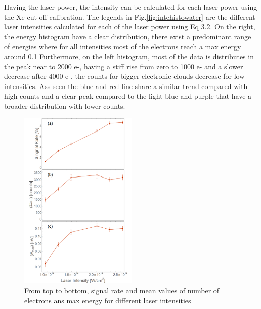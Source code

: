 Having the laser power, the intensity can be calculated for each laser power using the Xe cut off calibration. The legends in Fig.\ref{fig:intehistowater} are the different laser intensities calculated for each of the laser power using Eq 3.2. On the right, the energy histogram have a clear distribution, there exist a predominant range of energies where for all intensities most of the electrons reach a max energy around 0.1  Furthermore, on the left histogram, most of the data is distributes in the peak near to 2000 e-, having a stiff rise from zero to 1000 e- and a slower decrease after 4000 e-, the counts for bigger electronic clouds  decrease for low intensities. Ass seen the blue and red line share a similar trend compared with high counts and a clear peak compared to the light blue and purple that have a broader distribution with lower counts.

\begin{figure}[h!]
\centering
\includegraphics[width=0.5\textwidth]{../Images/results/MIR_He_waterIntensityscan/alltogether.png}
\caption[MIR He intensity dependence]{From top to bottom, signal rate and mean values of number of electrons ans max energy for different laser intensities}
\label{fig:Heintensimeanwater}
\end{figure}

